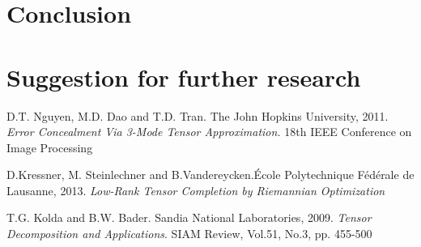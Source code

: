 \documentclass[a4paper, 11pt]{article} %
\begin{document}
\section{Conclusion}
\section{Suggestion for further research}

\begin{thebibliography}{9}

D.T. Nguyen, M.D. Dao and T.D. Tran. {The John Hopkins University}, 2011.
\textit{Error Concealment Via 3-Mode Tensor Approximation.} 18th IEEE Conference on Image Processing


D.Kressner, M. Steinlechner and B.Vandereycken.{\'Ecole Polytechnique F\'ed\'erale de Lausanne}, 2013. \textit{Low-Rank Tensor Completion by Riemannian Optimization}


  T.G. Kolda and B.W. Bader. {Sandia National Laboratories}, 2009.
\textit{Tensor Decomposition and Applications}. SIAM Review, Vol.51, No.3, pp. 455-500
\end{thebibliography}

%
%
%
\end{document}
